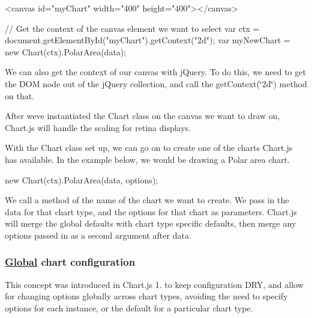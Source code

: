 \begin{DoxyCode}
<canvas id="myChart" width="400" height="400"></canvas>
\end{DoxyCode}



\begin{DoxyCode}
// Get the context of the canvas element we want to select
var ctx = document.getElementById("myChart").getContext("2d");
var myNewChart = new Chart(ctx).PolarArea(data);
\end{DoxyCode}


We can also get the context of our canvas with j\+Query. To do this, we need to get the D\+OM node out of the j\+Query collection, and call the {\ttfamily get\+Context(\char`\"{}2d\char`\"{})} method on that.




After we\textquotesingle{}ve instantiated the Chart class on the canvas we want to draw on, Chart.\+js will handle the scaling for retina displays.

With the Chart class set up, we can go on to create one of the charts Chart.\+js has available. In the example below, we would be drawing a Polar area chart.


\begin{DoxyCode}
new Chart(ctx).PolarArea(data, options);
\end{DoxyCode}


We call a method of the name of the chart we want to create. We pass in the data for that chart type, and the options for that chart as parameters. Chart.\+js will merge the global defaults with chart type specific defaults, then merge any options passed in as a second argument after data.

\subsubsection*{\hyperlink{class_global}{Global} chart configuration}

This concept was introduced in Chart.\+js 1. to keep configuration D\+RY, and allow for changing options globally across chart types, avoiding the need to specify options for each instance, or the default for a particular chart type.


